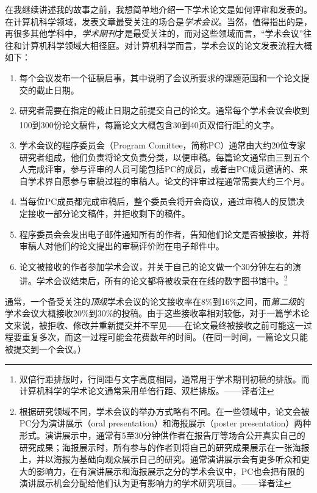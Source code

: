 \documentclass[letter,12pt]{book}
\begin{document}
\begin{CJK}{UTF8}{gbsn}
\breakline

在我继续讲述我的故事之前，我想简单地介绍一下学术论文是如何评审和发表的。在计算机科学领域，发表文章最受关注的场合是\emph{学术会议}。当然，值得指出的是，再很多其他学科中，\emph{学术期刊}才是最受关注的，而对这些领域而言，“学术会议”往往和计算机科学领域大相径庭。对计算机科学而言，学术会议的论文发表流程大概如下：

\begin{enumerate}
\item 每个会议发布一个征稿启事，其中说明了会议所要求的课题范围和一个论文提交的截止日期。
\item 研究者需要在指定的截止日期之前提交自己的论文。通常每个学术会议会收到100到300份论文稿件，每篇论文大概包含30到40页双倍行距\footnote{双倍行距排版时，行间距与文字高度相同，通常用于学术期刊初稿的排版。而计算机科学的学术论文通常采用单倍行距、双栏排版。——译者注}的文字。
\item 学术会议的程序委员会（Program Comittee，简称PC）通常由大约20位专家研究者组成，他们负责将论文负责分类，以便审稿。每篇论文通常由三到五个人完成评审，参与评审的人员可能包括PC的成员，或者由PC成员邀请的、来自学术界自愿参与审稿过程的审稿人。论文的评审过程通常需要大约三个月。
\item 当每位PC成员都完成审稿后，整个委员会将开会商议，通过审稿人的反馈决定接收一部分论文稿件，并拒收剩下的稿件。
\item 程序委员会会发出电子邮件通知所有的作者，告知他们论文是否被接收，并将审稿人对他们的论文提出的审稿评价附在电子邮件中。
\item 论文被接收的作者参加学术会议，并关于自己的论文做一个30分钟左右的演讲。学术会议结束后，所有的论文都将被收录在在线的数字图书馆中。\footnote{根据研究领域不同，学术会议的举办方式略有不同。在一些领域中，论文会被PC分为演讲展示（oral presentation）和海报展示（poster presentation）两种形式。演讲展示中，通常有5至30分钟供作者在报告厅等场合公开真实自己的研究成果；海报展示时，所有参与的作者则将自己的研究成果展示在一张海报上，并以海报为基础向观众展示自己的研究。通常演讲展示会有更多听众和更大的影响力，在有演讲展示和海报展示之分的学术会议中，PC也会把有限的演讲展示机会分配给他们认为更有影响力的学术研究项目。——译者注}
\end{enumerate}

通常，一个备受关注的\emph{顶级}学术会议的论文接收率在8\%到16\%之间，而\emph{第二级}的学术会议大概接收20\%到30\%的投稿。由于这些接收率相对较低，对于一篇学术论文来说，被拒收、修改并重新提交并不罕见——在论文最终被接收之前可能这一过程要重复多次，而这一过程可能会花费数年的时间。（在同一时间，一篇论文只能被提交到一个会议。）


\end{CJK}
\end{document}

